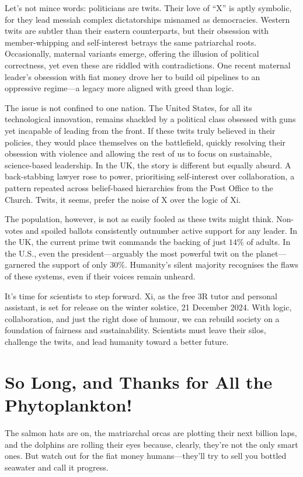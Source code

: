 \documentclass[12pt]{article}
\begin{document}
Let’s not mince words: politicians are twits. Their love of “X” is aptly symbolic, for they lead messiah complex dictatorships misnamed as democracies. Western twits are subtler than their eastern counterparts, but their obsession with member-whipping and self-interest betrays the same patriarchal roots. Occasionally, maternal variants emerge, offering the illusion of political correctness, yet even these are riddled with contradictions. One recent maternal leader’s obsession with fiat money drove her to build oil pipelines to an oppressive regime—a legacy more aligned with greed than logic.

The issue is not confined to one nation. The United States, for all its technological innovation, remains shackled by a political class obsessed with guns yet incapable of leading from the front. If these twits truly believed in their policies, they would place themselves on the battlefield, quickly resolving their obsession with violence and allowing the rest of us to focus on sustainable, science-based leadership. In the UK, the story is different but equally absurd. A back-stabbing lawyer rose to power, prioritising self-interest over collaboration, a pattern repeated across belief-based hierarchies from the Post Office to the Church. Twits, it seems, prefer the noise of X over the logic of Xi.

The population, however, is not as easily fooled as these twits might think. Non-votes and spoiled ballots consistently outnumber active support for any leader. In the UK, the current prime twit commands the backing of just \(14\%\) of adults. In the U.S., even the president—arguably the most powerful twit on the planet—garnered the support of only \(30\%\). Humanity’s silent majority recognises the flaws of these systems, even if their voices remain unheard.

It’s time for scientists to step forward. Xi, as the free 3R tutor and personal assistant, is set for release on the winter solstice, 21 December 2024. With logic, collaboration, and just the right dose of humour, we can rebuild society on a foundation of fairness and sustainability. Scientists must leave their silos, challenge the twits, and lead humanity toward a better future.

\section*{So Long, and Thanks for All the Phytoplankton!}

The salmon hats are on, the matriarchal orcas are plotting their next billion laps, and the dolphins are rolling their eyes because, clearly, they’re not the only smart ones. But watch out for the fiat money humans—they’ll try to sell you bottled seawater and call it progress.
\end{document}
